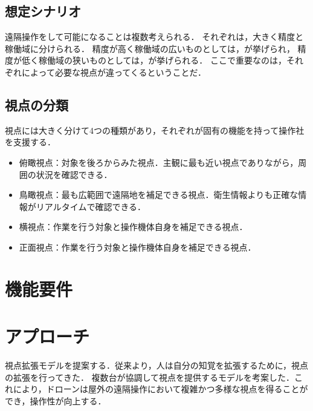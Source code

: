 \subsection{想定シナリオ}
遠隔操作をして可能になることは複数考えられる．
それぞれは，大きく精度と稼働域に分けられる．
精度が高く稼働域の広いものとしては，が挙げられ，
精度が低く稼働域の狭いものとしては，が挙げられる．
ここで重要なのは，それぞれによって必要な視点が違ってくるということだ．

\subsection{視点の分類}
視点には大きく分けて4つの種類があり，それぞれが固有の機能を持って操作社を支援する．
\begin{itemize}
\item 俯瞰視点：対象を後ろからみた視点．主観に最も近い視点でありながら，周囲の状況を確認できる．
\item 鳥瞰視点：最も広範囲で遠隔地を補足できる視点．衛生情報よりも正確な情報がリアルタイムで確認できる．
\item 横視点：作業を行う対象と操作機体自身を補足できる視点．
\item 正面視点：作業を行う対象と操作機体自身を補足できる視点．
\end{itemize}

\section{機能要件}

\section{アプローチ}
視点拡張モデルを提案する．従来より，人は自分の知覚を拡張するために，視点の拡張を行ってきた．
複数台が協調して視点を提供するモデルを考案した．これにより，ドローンは屋外の遠隔操作において複雑かつ多様な視点を得ることができ，操作性が向上する．





